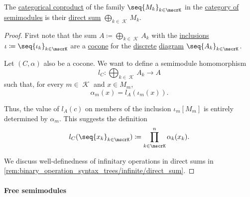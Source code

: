 \begin{proposition}\label{thm:semimodule_coproduct}
  The \hyperref[def:discrete_category_limits]{categorical coproduct} of the family \( \seq{ M_k }_{k \in \mscrK} \) in the \hyperref[def:semimodule/category]{category of  semimodules} is their \hyperref[def:semimodule_direct_sum]{direct sum} \( \bigoplus_{k \in \mscrK} M_k \).
\end{proposition}
\begin{proof}
  First note that the sum \( A \coloneqq \bigoplus_{k \in \mscrK} A_k \) with the \hyperref[def:semimodule_direct_sum/inclusion]{inclusions} \( \iota \coloneqq \seq{ \iota_k }_{k \in \mscrK} \) are a \hyperref[def:category_of_cones/cocone]{cocone} for the \hyperref[def:discrete_category]{discrete} \hyperref[def:categorical_diagram]{diagram} \( \seq{ A_k }_{k \in \mscrK} \).

  Let \( (C, \alpha) \) also be a cocone. We want to define a semimodule homomorphism
  \begin{equation*}
    l_C: \bigoplus_{k \in \mscrK} A_k \to A
  \end{equation*}
  such that, for every \( m \in \mscrK \) and \( x \in M_m \),
  \begin{equation*}
    \alpha_m(x) = l_A(\iota_m(x)).
  \end{equation*}

  Thus, the value of \( l_A(c) \) on members of the inclusion \( \iota_m[M_m] \) is entirely determined by \( \alpha_m \). This suggests the definition
  \begin{equation*}
    l_C(\seq{ x_k }_{k \in \mscrK}) \coloneqq \prod_{k \in \mscrK}^n \alpha_k(x_k).
  \end{equation*}

  We discuss well-definedness of infinitary operations in direct sums in \cref{rem:binary_operation_syntax_trees/infinite/direct_sum}.
\end{proof}

\paragraph{Free semimodules}

